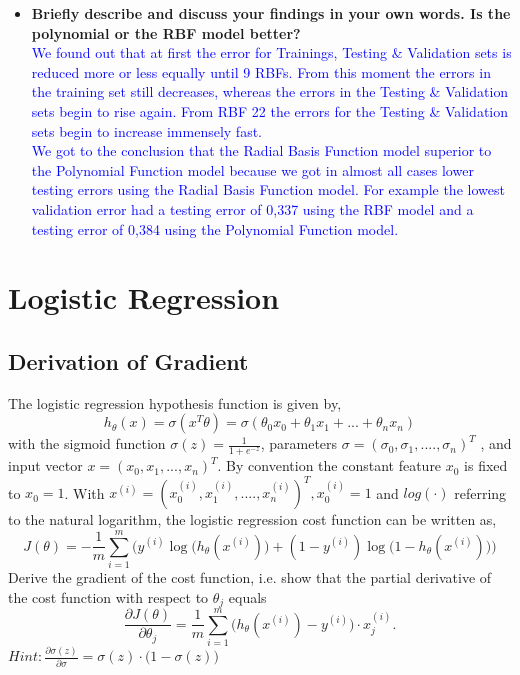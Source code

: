 \documentclass[a4paper]{article}
\begin{document}
\begin{itemize}
\item \textbf{Briefly describe and discuss your findings in your own words. Is the polynomial or the RBF model better?} \\
\textcolor{blue}{ We found out that at first the error for Trainings, Testing \& Validation sets is reduced more or less equally until 9 RBFs. From this moment the errors in the training set still decreases,  whereas the errors in the Testing \& Validation sets begin to rise again. From RBF 22 the errors for the Testing \& Validation sets begin to increase immensely fast.\\
We got to the conclusion that the Radial Basis Function model superior to the Polynomial Function model because we got in almost all cases lower testing errors using the Radial Basis Function model. For example the lowest validation error had a testing error of 0,337 using the RBF model  and  a testing error of 0,384 using the Polynomial Function model.}
\end{itemize}

\newpage

\section{Logistic Regression}
\subsection{Derivation of Gradient}
The logistic regression hypothesis function is given by,
\[
h_\theta(x)=\sigma(x^T\theta) =  \sigma(\theta_0x_0+\theta_1x_1+...+\theta_nx_n)
\]with the sigmoid function $\sigma(z)=\frac{1}{1+e^{-z}}$, parameters $\sigma=(\sigma_0,\sigma_1,....,\sigma_n)^T$ , and input vector $x = (x_0,x_1,...,x_n)^T$. 
By convention the constant feature $x_0$ is fixed to $x_0 = 1$. With $x^{(i)} = (x^{(i)}_0, x^{(i)}_1,....,x^{(i)}_n)^T,x^{(i)}_0 = 1$ and $log(\cdot)$ referring to the natural logarithm, the logistic regression cost function can be written as,
\[
J(\theta)=-\frac{1}{m}\sum_{i=1}^{m}\bigg(y^{(i)} \log\Big(h_\theta(x^{(i)} )\Big)+(1-y^{(i)})\log\Big(1-h_\theta(x^{(i)} )\Big)\bigg)  
\]Derive the gradient of the cost function, i.e. show that the partial derivative of the cost function with
respect to $\theta_j$ equals
\[
\frac{\partial J (\theta)}{\partial \theta_j} = \frac{1}{m}\sum_{i=1}^{m} \Big (h_\theta(x^{(i)})-y^{(i)}\Big) \cdot x^{(i)}_j.
\] $Hint: \frac{\partial \sigma(z)}{\partial \sigma} = \sigma(z)\cdot \Big(1-\sigma(z)\Big)$
\end{document}
